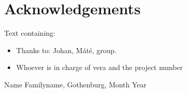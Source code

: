 \thispagestyle{plain}			%
\section*{Acknowledgements}

Text containing:
\begin{itemize}
    \item Thanks to: Johan, Máté, group.
    \item Whoever is in charge of vera and the project number 
\end{itemize}

\vspace{1.5cm}
\hfill
Name Familyname, Gothenburg, Month Year

\newpage				%
\thispagestyle{empty}
\mbox{}
